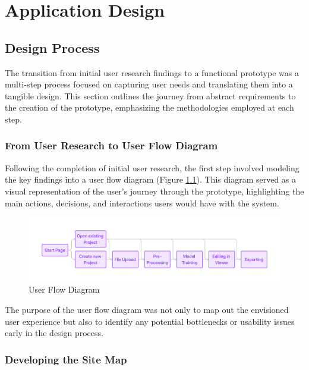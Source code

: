 %
\chapter{Application Design}
\label{sec:design}

\section{Design Process}
\label{sec:design:ux}

The transition from initial user research findings to a functional prototype was a multi-step process focused on capturing user needs and translating them into a tangible design.
This section outlines the journey from abstract requirements to the creation of the prototype, emphasizing the methodologies employed at each step.

\subsection*{From User Research to User Flow Diagram}

Following the completion of initial user research, the first step involved modeling the key findings into a user flow diagram (Figure \ref{fig:design:flow-1}).
This diagram served as a visual representation of the user's journey through the prototype, highlighting the main actions, decisions, and interactions users would have with the system.

\begin{figure}[h!]
	\includegraphics[width=\textwidth]{figures/flow-1.png}
	\caption{User Flow Diagram}
	\label{fig:design:flow-1}
\end{figure}

The purpose of the user flow diagram was not only to map out the envisioned user experience but also to identify any potential bottlenecks or usability issues early in the design process.

\subsection*{Developing the Site Map}

